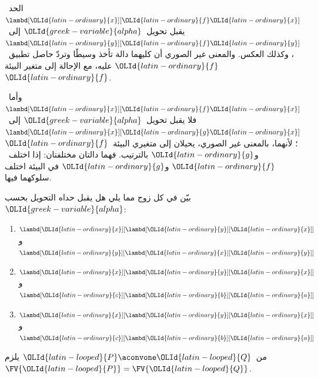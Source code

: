 \documentclass[../../../include/open-logic-section]{subfiles}
\begin{document}
\begin{ex}
  الحد~$\lambd[\OLId{latin-ordinary}{x}][\OLId{latin-ordinary}{f} \OLId{latin-ordinary}{x}]$ يقبل تحويل~$\OLId{greek-variable}{alpha}$ إلى~$\lambd[\OLId{latin-ordinary}{y}][\OLId{latin-ordinary}{f}
  \OLId{latin-ordinary}{y}]$، وكذلك العكس.
  والمعنى غير الصوري أن كليهما دالة تأخذ وسيطًا وتردّ حاصل تطبيق~$\OLId{latin-ordinary}{f}$ عليه،
  مع الإحالة إلى متغير البيئة~$\OLId{latin-ordinary}{f}$.

  وأما~$\lambd[\OLId{latin-ordinary}{x}][\OLId{latin-ordinary}{f} \OLId{latin-ordinary}{x}]$ فلا يقبل تحويل~$\OLId{greek-variable}{alpha}$ إلى~$\lambd[\OLId{latin-ordinary}{x}][\OLId{latin-ordinary}{g}
    \OLId{latin-ordinary}{x}]$؛
  لأنهما، بالمعنى غير الصوري، يحيلان إلى متغيري البيئة~$\OLId{latin-ordinary}{f}$ و$\OLId{latin-ordinary}{g}$ بالترتيب.
  فهما دالتان مختلفتان: إذا اختلف~$\OLId{latin-ordinary}{f}$ و$\OLId{latin-ordinary}{g}$ في البيئة اختلف سلوكهما فيها.
\end{ex}

\begin{prob}
  بيّن في كل زوج مما يلي هل يقبل حداه التحويل بحسب~$\OLId{greek-variable}{alpha}$:
  \begin{enumerate}
  \item $\lambd[\OLId{latin-ordinary}{x}][\lambd[\OLId{latin-ordinary}{y}][\OLId{latin-ordinary}{x}]]$ و$\lambd[\OLId{latin-ordinary}{y}][\lambd[\OLId{latin-ordinary}{x}][\OLId{latin-ordinary}{y}]]$
  \item $\lambd[\OLId{latin-ordinary}{x}][\lambd[\OLId{latin-ordinary}{y}][\OLId{latin-ordinary}{x}]]$ و$\lambd[\OLId{latin-ordinary}{c}][\lambd[\OLId{latin-ordinary}{b}][\OLId{latin-ordinary}{a}]]$
  \item $\lambd[\OLId{latin-ordinary}{x}][\lambd[\OLId{latin-ordinary}{y}][\OLId{latin-ordinary}{x}]]$ و$\lambd[\OLId{latin-ordinary}{c}][\lambd[\OLId{latin-ordinary}{b}][\OLId{latin-ordinary}{a}]]$
  \end{enumerate}
\end{prob}

\begin{lem}
  من~$\OLId{latin-looped}{P} \aconvone \OLId{latin-looped}{Q}$ يلزم~$\FV{\OLId{latin-looped}{P}} = \FV{\OLId{latin-looped}{Q}}$.
\end{lem}
\end{document}
